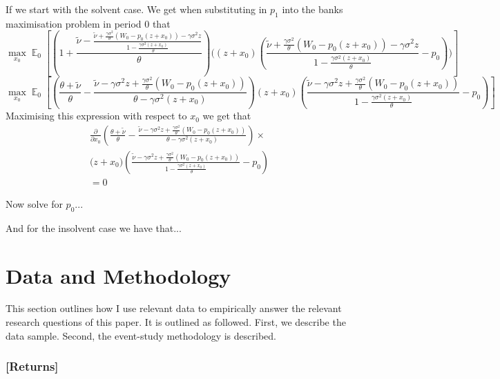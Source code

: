 \documentclass[11pt]{article}
\DeclareMathOperator{\E}{\mathbb{E}} %
\begin{document}
If we start with the solvent case. We get when substituting in $p_1$ into the banks maximisation problem in period 0 that
\begin{equation}
\max_{x_0} \E_0\left[\left(1 + \frac{\tilde{\nu} -\frac{\tilde{\nu} + \frac{\gamma \sigma^2}{\theta}(W_0 - p_0(z+x_0)) - \gamma \sigma^2z}{1 - \frac{\gamma\sigma^2(z+x_0)}{\theta}}}{\theta}\right)\bigg(\left(z+x_0\right)\left(\frac{\tilde{\nu} + \frac{\gamma \sigma^2}{\theta}(W_0 - p_0(z+x_0)) - \gamma \sigma^2z}{1 - \frac{\gamma\sigma^2(z+x_0)}{\theta}} - p_0\right) \bigg)  \right]
\end{equation}
\begin{equation}
\max_{x_0} \E_0\left[\left(\frac{\theta + \tilde{\nu}}{\theta} - \frac{\tilde{\nu} - \gamma \sigma^2z + \frac{\gamma \sigma^2}{\theta}(W_0 - p_0(z+x_0)) }{\theta - \gamma\sigma^2(z+x_0)}\right)\left(z+x_0\right)\left(\frac{\tilde{\nu} - \gamma \sigma^2z + \frac{\gamma \sigma^2}{\theta}(W_0 - p_0(z+x_0)) }{1 - \frac{\gamma\sigma^2(z+x_0)}{\theta}} - p_0\right)  \right]
\end{equation}
Maximising this expression with respect to $x_0$ we get that 
\begin{equation}
\begin{split}
\frac{\partial}{\partial x_0}\left(\frac{\theta + \tilde{\nu}}{\theta} - \frac{\tilde{\nu}  - \gamma \sigma^2z + \frac{\gamma \sigma^2}{\theta}(W_0 - p_0(z+x_0))}{\theta - \gamma\sigma^2(z+x_0)}\right)\times \\
\bigg(z+x_0\bigg)  \left(\frac{\tilde{\nu}  - \gamma \sigma^2z + \frac{\gamma \sigma^2}{\theta}(W_0 - p_0(z+x_0))}{1 - \frac{\gamma\sigma^2(z+x_0)}{\theta}} - p_0\right) \\
=0
\end{split}
\end{equation}

Now solve for $p_0$...

And for the insolvent case we have that...

\section{Data and Methodology}

This section outlines how I use relevant data to empirically answer the relevant research questions of this paper. It is outlined as followed. First, we describe the data sample. Second, the event-study methodology is described.

\subsubsection*{[Returns]}
\end{document}
